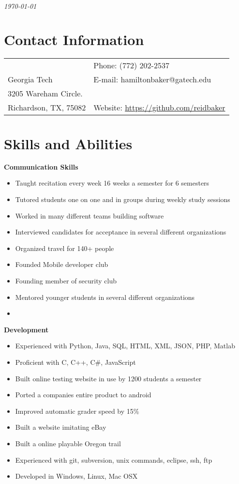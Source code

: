 \documentclass[margin,line]{res}
\begin{document}
 \hfill {\em \today}

\begin{resume}
\section{\sc Contact Information}

\vspace{.05in}
\begin{tabular}{@{}p{3.5in}p{3in}} & {Phone:}  (772) 202-2537 \\
Georgia Tech & {E-mail:}  hamiltonbaker@gatech.edu\\
3205 Wareham Circle. \\
Richardson, TX, 75082  & {Website:} \url{https://github.com/reidbaker}
\end{tabular}
 
\section{\sc Skills and Abilities}
        {\bf Communication Skills}
        \begin{itemize}
        \item Taught recitation every week 16 weeks a semester for 6 semesters
        \item Tutored students one on one and in groups during weekly
          study sessions
        \item Worked in many different teams building software
        \item Interviewed candidates for acceptance in several
          different organizations
        \item Organized travel for 140+ people
        \item Founded Mobile developer club
        \item Founding member of security club
        \item Mentored younger students in several different
          organizations
        \item
        \end{itemize}

        {\bf Development}
        \begin{itemize}
        \item Experienced with Python, Java, SQL, HTML, XML, JSON,
          PHP, Matlab
        \item Proficient with C, C++, C\#, JavaScript
        \item Built online testing website in use by 1200 students a
          semester
        \item Ported a companies entire product to android
        \item Improved automatic grader speed by 15\%
        \item Built a website imitating eBay
        \item Built a online playable Oregon trail
        \item Experienced with git, subversion, unix commands,
          eclipse, ssh, ftp
        \item Developed in Windows, Linux, Mac OSX 
        \end{itemize}


\end{resume}
\end{document}
